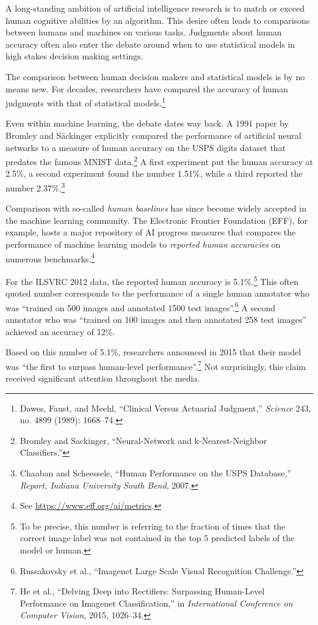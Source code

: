 \documentclass{tufte-book}
\begin{document}
A long-standing ambition of artificial intelligence research is to match
or exceed human cognitive abilities by an algorithm. This desire often
leads to comparisons between humans and machines on various tasks.
Judgments about human accuracy often also enter the debate around when
to use statistical models in high stakes decision making settings.

The comparison between human decision makers and statistical models is
by no means new. For decades, researchers have compared the accuracy of
human judgments with that of statistical models.\footnote{Dawes, Faust,
  and Meehl, {``Clinical Versus Actuarial Judgment,''} \emph{Science}
  243, no. 4899 (1989): 1668--74.}

Even within machine learning, the debate dates way back. A 1991 paper by
Bromley and Säckinger explicitly compared the performance of artificial
neural networks to a measure of human accuracy on the USPS digits
dataset that predates the famous MNIST data.\footnote{Bromley and
  Sackinger, {``Neural-Network and k-Nearest-Neighbor Classifiers.''}} A
first experiment put the human accuracy at 2.5\%, a second experiment
found the number 1.51\%, while a third reported the number
2.37\%.\footnote{Chaaban and Scheessele, {``Human Performance on the
  USPS Database,''} \emph{Report, Indiana University South Bend}, 2007.}

Comparison with so-called \emph{human baselines} has since become widely
accepted in the machine learning community. The Electronic Frontier
Foundation (EFF), for example, hosts a major repository of AI progress
measures that compares the performance of machine learning models to
\emph{reported human accuracies} on numerous benchmarks.\footnote{See
  \url{https://www.eff.org/ai/metrics}.}

For the ILSVRC 2012 data, the reported human accuracy is
5.1\%.\footnote{To be precise, this number is referring to the fraction
  of times that the correct image label was not contained in the top 5
  predicted labels of the model or human.} This often quoted number
corresponds to the performance of a single human annotator who was
``trained on 500 images and annotated 1500 test images''.\footnote{Russakovsky
  et al., {``Imagenet Large Scale Visual Recognition Challenge.''}} A
second annotator who was ``trained on 100 images and then annotated 258
test images'' achieved an accuracy of 12\%.

Based on this number of 5.1\%, researchers announced in 2015 that their
model was ``the first to surpass human-level performance''.\footnote{He
  et al., {``Delving Deep into Rectifiers: Surpassing Human-Level
  Performance on Imagenet Classification,''} in \emph{International
  Conference on Computer Vision}, 2015, 1026--34.} Not surprisingly,
this claim received significant attention throughout the media.
\end{document}
